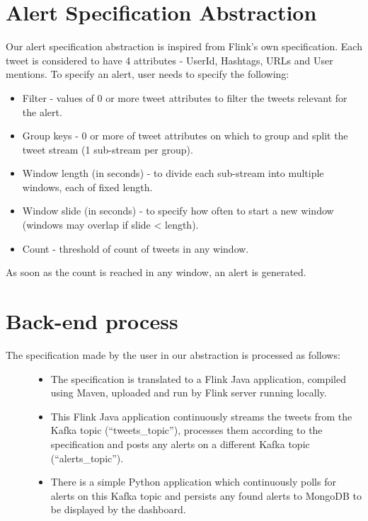 \documentclass[letterpaper,10pt,english]{sphinxmanual}
\begin{document}
\section{Alert Specification Abstraction}
\label{\detokenize{flink:alert-specification-abstraction}}
Our alert specification abstraction is inspired from Flink’s own specification. Each tweet is considered to have 4 attributes - UserId, Hashtags, URLs and User mentions. To specify an alert, user needs to specify the following:
\begin{itemize}
\item {} 
Filter - values of 0 or more tweet attributes to filter the tweets relevant for the alert.

\item {} 
Group keys - 0 or more of tweet attributes on which to group and split the tweet stream (1 sub-stream per group).

\item {} 
Window length (in seconds) - to divide each sub-stream into multiple windows, each of fixed length.

\item {} 
Window slide (in seconds) - to specify how often to start a new window (windows may overlap if slide \textless{} length).

\item {} 
Count - threshold of count of tweets in any window.

\end{itemize}

As soon as the count is reached in any window, an alert is generated.


\section{Back-end process}
\label{\detokenize{flink:back-end-process}}\begin{description}
\item[{The specification made by the user in our abstraction is processed as follows:}] \leavevmode\begin{itemize}
\item {} 
The specification is translated to a Flink Java application, compiled using Maven, uploaded and run by Flink server running locally.

\item {} 
This Flink Java application continuously streams the tweets from the Kafka topic (“tweets\_topic”), processes them according to the specification and posts any alerts on a different Kafka topic (“alerts\_topic”).

\item {} 
There is a simple Python application which continuously polls for alerts on this Kafka topic and persists any found alerts to MongoDB to be displayed by the dashboard.

\end{itemize}

\end{description}
\end{document}
